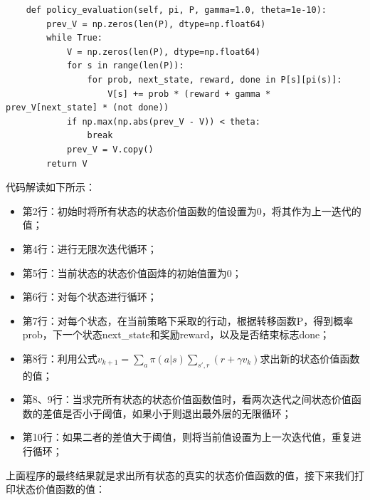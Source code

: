 \begin{lstlisting}
    def policy_evaluation(self, pi, P, gamma=1.0, theta=1e-10):
        prev_V = np.zeros(len(P), dtype=np.float64)
        while True:
            V = np.zeros(len(P), dtype=np.float64)
            for s in range(len(P)):
                for prob, next_state, reward, done in P[s][pi(s)]:
                    V[s] += prob * (reward + gamma * prev_V[next_state] * (not done))
            if np.max(np.abs(prev_V - V)) < theta:
                break
            prev_V = V.copy()
        return V
\end{lstlisting}
代码解读如下所示：
\begin{itemize}
    \item 第2行：初始时将所有状态的状态价值函数的值设置为0，将其作为上一迭代的值；
    \item 第4行：进行无限次迭代循环；
    \item 第5行：当前状态的状态价值函烽的初始值置为0；
    \item 第6行：对每个状态进行循环；
    \item 第7行：对每个状态，在当前策略下采取的行动，根据转移函数P，得到概率prob，下一个状态next\_state和奖励reward，以及是否结束标志done；
    \item 第8行：利用公式$v_{k+1}=\sum_{a} \pi(a|s) \sum_{s',r} (r + \gamma v_{k})$求出新的状态价值函数的值；
    \item 第8、9行：当求完所有状态的状态价值函数值时，看两次迭代之间状态价值函数的差值是否小于阈值，如果小于则退出最外层的无限循环；
    \item 第10行：如果二者的差值大于阈值，则将当前值设置为上一次迭代值，重复进行循环；
\end{itemize}
上面程序的最终结果就是求出所有状态的真实的状态价值函数的值，接下来我们打印状态价值函数的值：
